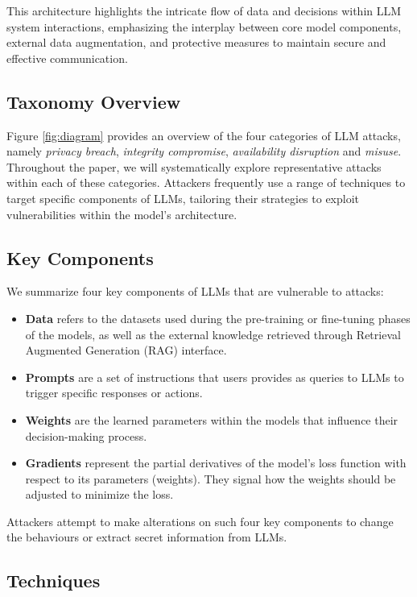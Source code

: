 This architecture highlights the intricate flow of data and decisions within LLM system interactions, emphasizing the interplay between core model components, external data augmentation, and protective measures to maintain secure and effective communication.

\subsection{Taxonomy Overview}

Figure \ref{fig:diagram} provides an overview of the four categories of LLM attacks, namely {\em privacy breach}, {\em integrity compromise}, {\em availability disruption} and {\em misuse}. Throughout the paper, we will systematically explore representative attacks within each of these categories. Attackers frequently use a range of techniques to target specific components of LLMs, tailoring their strategies to exploit vulnerabilities within the model's architecture.

\subsection{Key Components}

We summarize four key components of LLMs that are vulnerable to attacks:
\begin{itemize}
    \item{\bf Data} refers to the datasets used during the pre-training or fine-tuning phases of the models, as well as the external knowledge retrieved through Retrieval Augmented Generation (RAG) interface.
    \item{\bf Prompts} are a set of instructions that users provides as queries to LLMs to trigger specific responses or actions.
    \item{\bf Weights} are the learned parameters within the models that influence their decision-making process.
    \item{\bf Gradients} represent the partial derivatives of the model's loss function with respect to its parameters (weights). They signal how the weights should be adjusted to minimize the loss.
\end{itemize}
Attackers attempt to make alterations on such four key components to change the behaviours or extract secret information from LLMs.

\subsection{Techniques}

